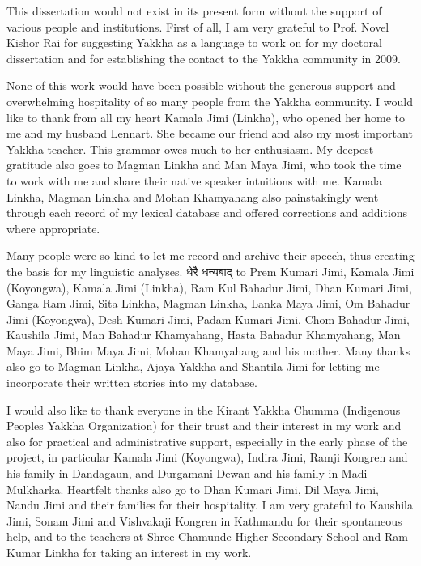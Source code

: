 \begin{refsection}

This dissertation would not exist in its present form without the support of various people and institutions. First of all, I am very grateful to Prof. Novel Kishor Rai for suggesting Yakkha as a language to work on for my doctoral dissertation and for establishing the contact to the Yakkha community in 2009.

None of this work would have been possible without the generous support and overwhelming hospitality of so many people from the Yakkha community. I would like to thank from all my heart Kamala  Jimi (Linkha), who opened her home to me and my husband Lennart. She became our friend and also my most important Yakkha teacher. This grammar owes much to her enthusiasm. My deepest gratitude also goes to Magman Linkha and Man Maya Jimi, who took the time to work with me and share their native speaker intuitions with me. Kamala Linkha, Magman Linkha and Mohan Khamyahang also painstakingly went through each record of my lexical database and offered corrections and additions where appropriate.

Many people were so kind to let me record and archive their speech, thus creating the basis for my linguistic analyses. {\Deva धेरै धन्यबाद्} to Prem Kumari Jimi, Kamala Jimi (Koyongwa), Kamala Jimi (Linkha), Ram Kul Bahadur Jimi, Dhan Kumari Jimi, Ganga Ram Jimi, Sita Linkha, Magman Linkha, Lanka Maya Jimi, Om Bahadur Jimi (Koyongwa), Desh Kumari Jimi, Padam Kumari Jimi, Chom Bahadur Jimi, Kaushila Jimi, Man Bahadur Khamyahang, Hasta Bahadur Khamyahang, Man Maya  Jimi, Bhim Maya  Jimi, Mohan Khamyahang and his mother. Many thanks also go to Magman Linkha, Ajaya Yakkha and Shantila Jimi for letting me incorporate their written stories into my database.   
 
I would also like to thank everyone in the Kirant Yakkha Chumma (Indigenous Peoples Yakkha Organization) for their trust and their interest in my work and also for practical and administrative support, especially in the early phase of the project, in particular Kamala Jimi (Koyongwa), Indira Jimi, Ramji Kongren and his family in Dandagaun, and Durgamani Dewan and his family in Madi Mulkharka. Heartfelt thanks also go to Dhan Kumari Jimi, Dil Maya Jimi, Nandu Jimi and their families for their hospitality. I am very grateful to Kaushila Jimi, Sonam Jimi and Vishvakaji Kongren in Kathmandu for their spontaneous help, and to the teachers at Shree Chamunde Higher Secondary School and Ram Kumar Linkha for taking an interest in my work.


\end{refsection}
